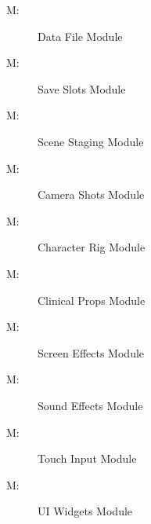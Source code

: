 \documentclass[12pt, titlepage]{article}
\newcounter{mnum}
\newcommand{\mthemnum}{M\themnum}
\begin{document}
\begin{description}
\item [ \mthemnum \label{mDataFile}:] Data File Module
\item [ \mthemnum \label{mSlots}:] Save Slots Module
\item [ \mthemnum \label{mStaging}:] Scene Staging Module
\item [ \mthemnum \label{mCamera}:] Camera Shots Module
\item [ \mthemnum \label{mRig}:] Character Rig Module
\item [ \mthemnum \label{mProps}:] Clinical Props Module
\item [ \mthemnum \label{mEffects}:] Screen Effects Module
\item [ \mthemnum \label{mSound}:] Sound Effects Module
\item [ \mthemnum \label{mTouch}:] Touch Input Module
\item [ \mthemnum \label{mWidgets}:] UI Widgets Module
\end{description}
\end{document}
